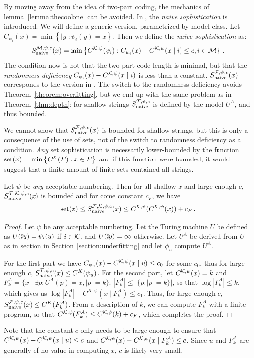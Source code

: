 By moving away from the idea of two-part coding, the mechanics of lemma~\ref{lemma:thecoolone} can be avoided. In \cite{mota2013sophistication}, the \emph{naive sophistication} is introduced. We will define a generic version, parametrized by model class. Let $C_{\psi_i}(x) = \min\left\{|y| : \psi_i(y) = x\right\}$. Then we define the \emph{naive sophistication} as:
\[
S_{\textnormal{naive}}^{{\cal M}, \psi, c}(x) = \min\left\{C^{{\cal K}, \psi}(\psi_i) : C_{\psi_i}(x) - C^{{\cal K},\psi}(x\mid i) \leq c, i \in {\cal M} \right\} \,\text{.}
\]
\noindent The condition now is not that the two-part code length is minimal, but that the \emph{randomness deficiency} $C_{\psi_i}(x) - C^{{\cal K},\psi}(x\mid i)$ is less than a constant. $S_{\textnormal{naive}}^{{\cal F},\psi,c}(x)$ corresponds to the version in \cite{mota2013sophistication}. The switch to the randomness deficiency avoids Theorem~\ref{theorem:overfitting}, but we end up with the same problem as in Theorem~\ref{thm:depth}: for shallow strings $S_{\textnormal{naive}}^{{\cal T}, \psi, c}$ is defined by the model $U^A$, and thus bounded.

We cannot show that $S_{\textnormal{naive}}^{{\cal F}, \psi, c}(x)$ is bounded for shallow strings, but this is only a consequence of the use of sets, not of the switch to randomness deficiency as a condition. \emph{Any} set sophistication is necessarily lower-bounded by the function $\textnormal{set}(x) = \min\left\{C^{\cal K}(F) : x \in F\right\}$ and if this function were bounded, it would suggest that a finite amount of finite sets contained all strings.
\begin{theorem}
Let $\psi$ be \emph{any} acceptable numbering. Then for all shallow $x$ and large enough $c$, $S_{\textnormal{naive}}^{{\cal T},{\cal K},\psi,c}(x)$ is bounded and for come constant $c_F$, we have:\belowdisplayskip=-12pt
\[
\textnormal{set}(x) \leq S_{\textnormal{naive}}^{{\cal F},{\cal K},\psi,c}(x) \leq C^{{\cal K},\psi}(C^{{\cal K}, \psi}(x)) + c_F \,\text{.}
\]\label{theorem:naive}
\end{theorem}
\begin{proof}
Let $\psi$ be any acceptable numbering. Let the Turing machine $U$ be defined as $U(\bar\imath y) = \psi_i(y)$ if $i \in {\cal K}$, and $U(\bar\imath y) = \infty$ otherwise. Let $U^A$ be derived from $U$ as in section in Section~\ref{section:underfitting} and let $\phi_u$ compute $U^A$.

For the first part we have $C_{\psi_u}(x) - C^{{\cal K}, \psi}(x\mid u) \leq c_0$ for some $c_0$, thus for large enough $c$, $S_\text{naive}^{{\cal T},\psi,c}(x) \leq C^K(\psi_u)$. For the second part, let $C^{{\cal K},\psi}(x) = k$ and $F^A_k = \{x \mid \exists p : U^A(p) = x, |p| = k\}$. $|F^A_k| \leq |\{p : |p| = k\}|$, so that $\log |F^A_k| \leq k$, which gives us $\log |F^A_k| - C^{K, \psi}(x \mid F^A_k) \leq c_1$. Thus, for large enough $c$, $S_\text{naive}^{{\cal F},\psi,c}(x) \leq C^K(F^A_k)$. From a description of $k$, we can compute $F^A_k$ with a finite program, so that $C^{{\cal K},\psi}(F^A_k) \leq C^{{\cal K},\psi}(k) + c_F$, which completes the proof.
\end{proof}
Note that the constant $c$ only needs to be large enough to ensure that $C^{{\cal K},\psi}(x) - C^{{\cal K},\psi}(x\mid u) \leq c$ and $C^{{\cal K},\psi}(x) - C^{{\cal K},\psi}(x\mid F^A_k)\leq c$. Since $u$ and $F^A_k$ are generally of no value in computing $x$, $c$ is likely very small.

